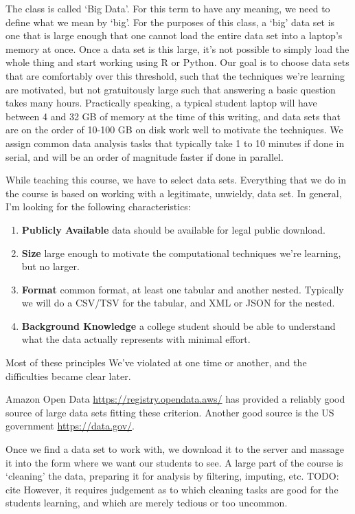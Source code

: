 \documentclass[12pt]{article}
\begin{document}
The class is called `Big Data'.
For this term to have any meaning, we need to define what we mean by `big'.
For the purposes of this class, a `big' data set is one that is large enough that one cannot load the entire data set into a laptop's memory at once.
Once a data set is this large, it's not possible to simply load the whole thing and start working using R or Python.
Our goal is to choose data sets that are comfortably over this threshold, such that the techniques we're learning are motivated, but not gratuitously large such that answering a basic question takes many hours.
Practically speaking, a typical student laptop will have between 4 and 32 GB of memory at the time of this writing, and data sets that are on the order of 10-100 GB on disk work well to motivate the techniques.
We assign common data analysis tasks that typically take 1 to 10 minutes if done in serial, and will be an order of magnitude faster if done in parallel.

While teaching this course, we have to select data sets.
Everything that we do in the course is based on working with a legitimate, unwieldy, data set.
In general, I'm looking for the following characteristics:
\begin{enumerate}
\item \textbf{Publicly Available} data should be available for legal public download.
\item \textbf{Size} large enough to motivate the computational techniques we're learning, but no larger.
\item \textbf{Format} common format, at least one tabular and another nested. Typically we will do a CSV/TSV for the tabular, and XML or JSON for the nested.
\item \textbf{Background Knowledge} a college student should be able to understand what the data actually represents with minimal effort.
\end{enumerate}

Most of these principles We've violated at one time or another, and the difficulties became clear later.

Amazon Open Data \url{https://registry.opendata.aws/} has provided a reliably good source of large data sets fitting these criterion. 
Another good source is the US government \url{https://data.gov/}.

Once we find a data set to work with, we download it to the server and massage it into the form where we want our students to see.
A large part of the course is `cleaning' the data, preparing it for analysis by filtering, imputing, etc.
TODO: cite
However, it requires judgement as to which cleaning tasks are good for the students learning, and which are merely tedious or too uncommon.
\end{document}
